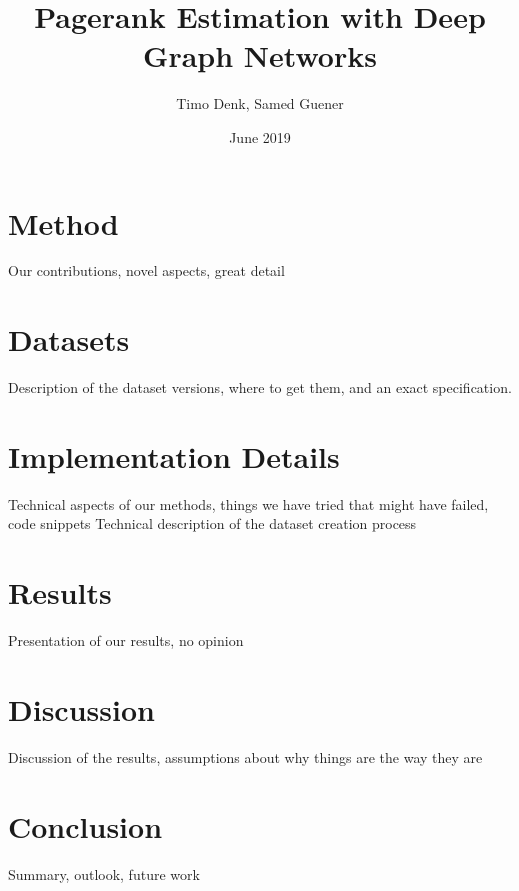 \documentclass{article}
\title{Pagerank Estimation with Deep Graph Networks}
\author{Timo Denk, Samed Guener}
\date{June 2019}
\begin{document}
\maketitle





\section{Method}
Our contributions, novel aspects, great detail

\section{Datasets}
Description of the dataset versions, where to get them, and an exact specification.

\section{Implementation Details}
Technical aspects of our methods, things we have tried that might have failed, code snippets
Technical description of the dataset creation process

\section{Results}
Presentation of our results, no opinion

\section{Discussion}
Discussion of the results, assumptions about why things are the way they are

\section{Conclusion}
Summary, outlook, future work


\label{sec:references}
\end{document}
